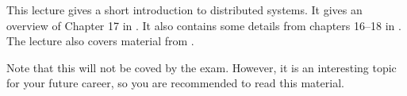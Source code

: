 This lecture gives a short introduction to distributed systems.
It gives an overview of Chapter 17 in \cite{Silberschatz2013osc}.
It also contains some details from chapters 16--18 in 
\cite{Silberschatz2009osc}.
The lecture also covers material from  
\cite{cacm2013numa}.

Note that this will not be coved by the exam.
However, it is an interesting topic for your future career, so you are 
recommended to read this material.
